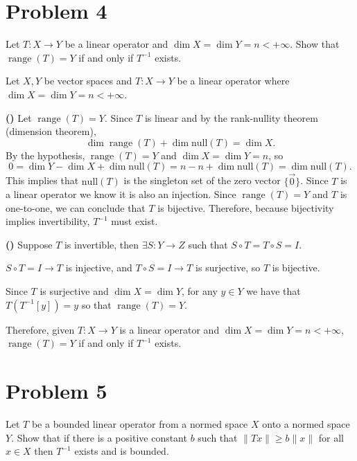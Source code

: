 \documentclass[12pt]{article}
\DeclareMathOperator{\range}{range}
\begin{document}
\newpage
\section{Problem 4}
\begin{mdframed}
    Let $T: X \to Y$ be a linear operator and $\dim{X} = \dim{Y} = n < +\infty$. Show that $\range{(T)} = Y$ 
    if and only if $T^{-1}$ exists.
\end{mdframed}

Let $X,Y$ be vector spaces and $T: X \to Y$ be a linear operator where $\dim{X} = \dim{Y} = n < +\infty$. 

\textbf{(\rightarrow)} Let $\range{(T)}=Y$. Since $T$ is linear and by the rank-nullity theorem (dimension theorem), 
\[
    \dim{\range{(T)}} + \dim{\text{null}(T)} = \dim{X}.
\]
By the hypothesis, $\range{(T)}=Y$ and $\dim{X}=\dim{Y}=n$, so
\[
    0 = \dim{Y} - \dim{X} + \dim{\text{null}(T)} = n - n +\dim{\text{null}(T)} = \dim{\text{null}(T)}.
\]
This implies that $\text{null}(T)$ is the singleton set of the zero vector $\{\vec{0}\}$. Since $T$ is a
linear operator we know it is also an injection. Since $\range{(T)}=Y$ and $T$ is one-to-one,
we can conclude that $T$ is bijective. Therefore, because bijectivity implies invertibility, $T^{-1}$ 
must exist.

\textbf{(\leftarrow)} Suppose $T$ is invertible, then $\exists S: Y \to Z$ such that 
$S \circ T = T \circ S = I$. 

$S \circ T = I \longrightarrow T$ is injective, and $T \circ S = I \longrightarrow T$ is surjective,
so $T$ is bijective.

Since $T$ is surjective and $\dim{X}=\dim{Y}$, for any $y\in Y$ we have that $T(T^{-1}[y])=y$ 
so that $\range{(T)}=Y$.

Therefore, given $T: X\to Y$ is a linear operator and $\dim{X}=\dim{Y}=n< +\infty$, $\range{(T)}=Y$ if
and only if $T^{-1}$ exists.



\newpage
\section{Problem 5}
\begin{mdframed}
    Let $T$ be a bounded linear operator from a normed space $X$ onto a normed space $Y$. Show that if
    there is a positive constant $b$ such that $\|Tx\| \geq b\|x\|$ for all $x\in X$ then $T^{-1}$ exists
    and is bounded.
\end{mdframed}
\end{document}
